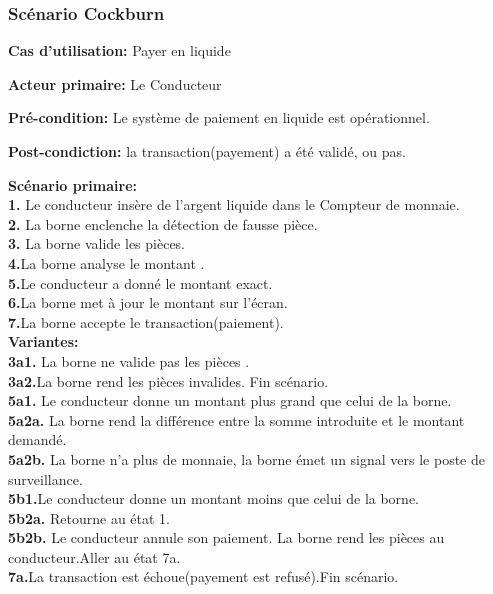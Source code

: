 \subsubsection{Scénario Cockburn}
\textbf{Cas d'utilisation:} Payer en liquide

\textbf{Acteur primaire:} Le Conducteur

\textbf{Pré-condition: } Le système de paiement en liquide est opérationnel.

\textbf{Post-condiction: }  la transaction(payement) a été validé, ou pas.


\textbf{Scénario primaire: } \\
    \textbf{1.} Le conducteur insère de l’argent liquide dans le Compteur de monnaie.\\
    \textbf{2.}  La borne enclenche la détection de fausse pièce.\\
    \textbf{3.} La borne valide les pièces.\\
    \textbf{4.}La borne analyse le montant .\\
    \textbf{5.}Le conducteur a donné le montant exact.\\
    \textbf{6.}La borne met à jour le montant sur  l’écran.\\
    \textbf{7.}La borne accepte le transaction(paiement).\\

\textbf{Variantes:}\\
    \textbf{3a1.} La borne ne valide pas les pièces .\\
    \textbf{3a2.}La borne rend les pièces invalides. Fin scénario.\\
    \textbf{5a1.} Le conducteur donne un montant plus grand que celui de la borne.\\
    \textbf{5a2a.} La borne rend la différence entre la somme introduite et le montant demandé. \\
    \textbf{5a2b.} La borne n’a plus de monnaie, la borne émet un signal vers le poste de surveillance.\\
    \textbf{5b1.}Le conducteur donne un montant moins que celui de la borne.\\
    \textbf{5b2a.} Retourne au état 1.\\
    \textbf{5b2b.} Le conducteur annule son paiement. La borne rend les pièces au conducteur.Aller au état 7a.\\
    \textbf{7a.}La transaction est échoue(payement est refusé).Fin scénario.
    
\newpage
